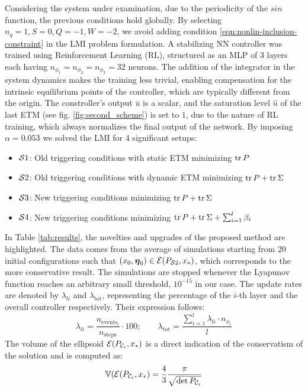 \documentclass{ifacconf}
\theoremstyle{plain}
\begin{document}
Considering the system under examination, due to the periodicity of the $sin$ function, the previous conditions hold globally. By selecting $n_q = 1, S = 0, Q = -1, W=-2$, we avoid adding condition \eqref{eqn:nonlin-inclusion-constraint} in the LMI problem formulation.
A stabilizing NN controller was trained using Reinforcement Learning (RL), structured as an MLP of $3$ layers each having $n_{\phi_1} = n_{\phi_2} = n_{\phi_3} = 32$ neurons. The addition of the integrator in the system dynamics makes the training less trivial, enabling compensation for the intrinsic equilibrium points of the controller, which are typically different from the origin. The constroller's output $\bar{u}$ is a scalar, and the saturation level $\widehat{u}$ of the last ETM (see fig. \ref{fig:second_scheme}) is set to $1$, due to the nature of RL training, which always normalizes the final output of the network. By imposing $\alpha = 0.053$ we solved the LMI for 4 significant setups:
\begin{itemize}
    \item ${\mathcal{S}} 1$: Old triggering conditions with static ETM minimizing $\operatorname{tr}{P}$ 
    \item ${\mathcal{S}} 2$: Old triggering conditions with dynamic ETM minimizing $\operatorname{tr}{P} + \operatorname{tr}{\Sigma}$
    \item ${\mathcal{S}} 3$: New triggering conditions minimizing $\operatorname{tr}{P} + \operatorname{tr}{\Sigma}$
    \item ${\mathcal{S}} 4$: New triggering conditions minimizing $\operatorname{tr}{P} + \operatorname{tr}{\Sigma} + \sum_{i=1}^l \beta_i$
\end{itemize}
In Table \ref{tab:results}, the novelties and upgrades of the proposed method are highlighted. The data comes from the average of simulations starting from $20$ initial configurations such that $(x_0, \boldsymbol{\eta}_0) \in {\mathcal{E}}(P_{{\mathcal{S}} 2}, x_*)$, which corresponds to the more conservative result. The simulations are stopped whenever the Lyapunov function reaches an arbitrary small threshold, $10^{-15}$ in our case. The update rates are denoted by $\lambda_{li}$ and $\lambda_{\text{tot}}$, representing the percentage of the $i$-th layer and the overall controller respectively. Their expression follows:
$$
\lambda_{li} = \frac{n_{\text{events}_i}}{n_{\text{steps}}} \cdot 100; \qquad \lambda_{\text{tot}} = \frac{\sum_{i=1}^l \lambda_{li} \cdot n_{\phi_i}}{l}
$$
The volume of the ellipsoid ${\mathcal{E}}(P_{{\mathcal{C}}_i}, x_*)$ is a direct indication of the conservatism of the solution and is computed as:
$$
{\mathbb{V}}({\mathcal{E}}(P_{{\mathcal{C}}_i}, x_*) = \frac{4}{3} \frac{\pi}{\sqrt{\det P_{{\mathcal{C}}_i}}}
$$
\end{document}
